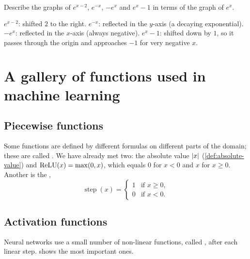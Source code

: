 \begin{exercise}
Describe the graphs of $e^{x-2}$, $e^{-x}$, $-e^x$ and $e^x - 1$ in terms of
the graph of $e^x$.
\end{exercise}
\begin{solution}
$e^{x-2}$: shifted $2$ to the right. $e^{-x}$: reflected in the $y$-axis (a
decaying exponential). $-e^x$: reflected in the $x$-axis (always negative).
$e^x - 1$: shifted down by $1$, so it passes through the origin and
approaches $-1$ for very negative $x$.
\end{solution}

\section{A gallery of functions used in machine learning}
\label{sec:activation-gallery}

\subsection{Piecewise functions}

Some functions are defined by different formulas on different parts of the
domain; these are called . We
have already met two: the absolute value $\lvert x\rvert$ (\cref{def:absolute-value})
and $\operatorname{ReLU}(x) = \max(0, x)$, which equals $0$ for $x < 0$ and $x$ for
$x \ge 0$. Another is the ,
\[
  \operatorname{step}(x) = \begin{cases} 1 & \text{if } x \ge 0,\\
  0 & \text{if } x < 0. \end{cases}
\]

\subsection{Activation functions}

Neural networks use a small number of non-linear functions, called
, after each linear step.
 shows the most important ones.

